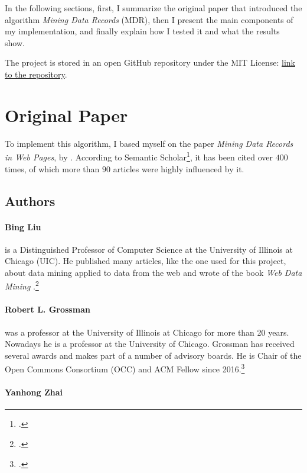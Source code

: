 \documentclass[10pt]{article}
\newcommand{\citefootnote}[1]{\footnote{\cite{#1}.}}
\begin{document}
In the following sections, first, I summarize the original paper that introduced the algorithm \emph{Mining Data Records} (MDR), then I present the main components of my implementation, and finally explain how I tested it and what the results show. 

The project is stored in an open GitHub repository under the MIT License: \href{https://github.com/joaopcbertoldo/pymdr/tree/0.1.1}{link to the repository}. 



\section{Original Paper}

To implement this algorithm, I based myself on the paper \emph{Mining Data Records in Web Pages}, by \cite{mdr-technical}. According to Semantic Scholar\citefootnote{mdr-semantic-scholar}, it has been cited over $400$ times, of which more than $90$ articles were highly influenced by it.



\subsection{Authors}

\paragraph{Bing Liu}

is a Distinguished Professor of Computer Science at the University of Illinois at Chicago (UIC). He published many articles, like the one used for this project, about data mining applied to data from the web and wrote of the book \emph{Web Data Mining} \citep{web-data-mining}.\citefootnote{liu-page}

\paragraph{Robert L. Grossman}

was a professor at the University of Illinois at Chicago for more than 20 years. Nowadays he is a professor at the University of Chicago. Grossman has received several awards and makes part of a number of advisory boards. He is Chair of the Open Commons Consortium (OCC) and ACM Fellow since 2016.\citefootnote{robert-page, robert-linkedin}

\paragraph{Yanhong Zhai}
\end{document}
